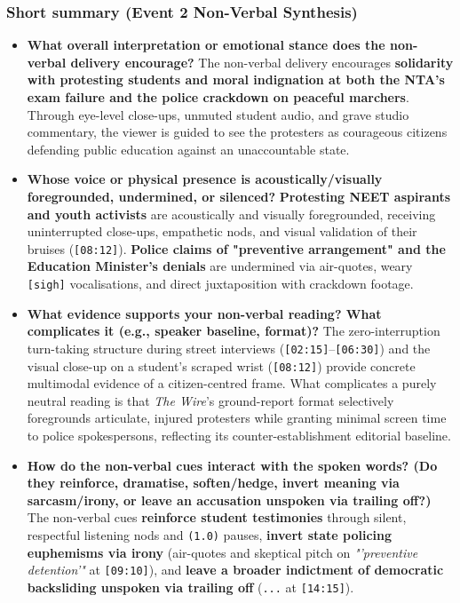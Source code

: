 \documentclass[10pt,a4paper]{article}
\begin{document}
\subsubsection*{Short summary (Event 2 Non-Verbal Synthesis)}

\begin{itemize}
  \item \textbf{What overall interpretation or emotional stance does the non-verbal delivery encourage?}
The non-verbal delivery encourages \textbf{solidarity with protesting students and moral indignation at both the NTA's exam failure and the police crackdown on peaceful marchers}. Through eye-level close-ups, unmuted student audio, and grave studio commentary, the viewer is guided to see the protesters as courageous citizens defending public education against an unaccountable state.\par\smallskip
  \item \textbf{Whose voice or physical presence is acoustically/visually foregrounded, undermined, or silenced?}
\textbf{Protesting NEET aspirants and youth activists} are acoustically and visually foregrounded, receiving uninterrupted close-ups, empathetic nods, and visual validation of their bruises (\texttt{[08:12]}). \textbf{Police claims of "preventive arrangement" and the Education Minister's denials} are undermined via air-quotes, weary \texttt{[sigh]} vocalisations, and direct juxtaposition with crackdown footage.\par\smallskip
  \item \textbf{What evidence supports your non-verbal reading? What complicates it (e.g., speaker baseline, format)?}
The zero-interruption turn-taking structure during street interviews (\texttt{[02:15]}--\texttt{[06:30]}) and the visual close-up on a student's scraped wrist (\texttt{[08:12]}) provide concrete multimodal evidence of a citizen-centred frame. What complicates a purely neutral reading is that \textit{The Wire}'s ground-report format selectively foregrounds articulate, injured protesters while granting minimal screen time to police spokespersons, reflecting its counter-establishment editorial baseline.\par\smallskip
  \item \textbf{How do the non-verbal cues interact with the spoken words? (Do they reinforce, dramatise, soften/hedge, invert meaning via sarcasm/irony, or leave an accusation unspoken via trailing off?)}
The non-verbal cues \textbf{reinforce student testimonies} through silent, respectful listening nods and \texttt{(1.0)} pauses, \textbf{invert state policing euphemisms via irony} (air-quotes and skeptical pitch on \textit{"'preventive detention'"} at \texttt{[09:10]}), and \textbf{leave a broader indictment of democratic backsliding unspoken via trailing off} (\texttt{...} at \texttt{[14:15]}).\par\smallskip

\end{itemize}
\end{document}
